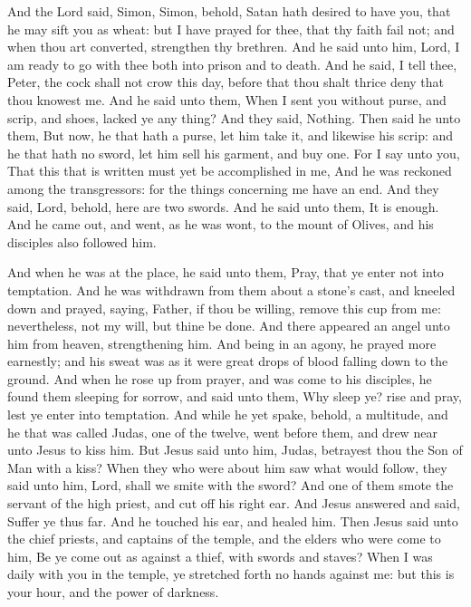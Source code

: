 And the Lord said, Simon, Simon, behold, Satan hath desired to have you, that he may sift you as wheat: but I have prayed for thee, that thy faith fail not; and when thou art converted, strengthen thy brethren. And he said unto him, Lord, I am ready to go with thee both into prison and to death. And he said, I tell thee, Peter, the cock shall not crow this day, before that thou shalt thrice deny that thou knowest me. And he said unto them, When I sent you without purse, and scrip, and shoes, lacked ye any thing? And they said, Nothing. Then said he unto them, But now, he that hath a purse, let him take it, and likewise his scrip: and he that hath no sword, let him sell his garment, and buy one. For I say unto you, That this that is written must yet be accomplished in me, And he was reckoned among the transgressors: for the things concerning me have an end. And they said, Lord, behold, here are two swords. And he said unto them, It is enough. And he came out, and went, as he was wont, to the mount of Olives, and his disciples also followed him.

And when he was at the place, he said unto them, Pray, that ye enter not into temptation. And he was withdrawn from them about a stone's cast, and kneeled down and prayed, saying, Father, if thou be willing, remove this cup from me: nevertheless, not my will, but thine be done. And there appeared an angel unto him from heaven, strengthening him. And being in an agony, he prayed more earnestly; and his sweat was as it were great drops of blood falling down to the ground. And when he rose up from prayer, and was come to his disciples, he found them sleeping for sorrow, and said unto them, Why sleep ye? rise and pray, lest ye enter into temptation. And while he yet spake, behold, a multitude, and he that was called Judas, one of the twelve, went before them, and drew near unto Jesus to kiss him. But Jesus said unto him, Judas, betrayest thou the Son of Man with a kiss? When they who were about him saw what would follow, they said unto him, Lord, shall we smite with the sword? And one of them smote the servant of the high priest, and cut off his right ear. And Jesus answered and said, Suffer ye thus far. And he touched his ear, and healed him. Then Jesus said unto the chief priests, and captains of the temple, and the elders who were come to him, Be ye come out as against a thief, with swords and staves? When I was daily with you in the temple, ye stretched forth no hands against me: but this is your hour, and the power of darkness.

